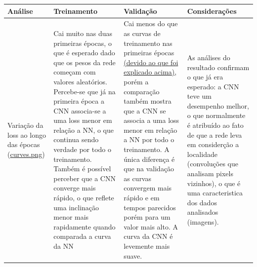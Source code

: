 \documentclass[11pt,a4paper]{article}
\begin{document}
\begin{table}[H]
\centering
\begin{tabular}{>{\raggedright\arraybackslash}p{} >{\raggedright\arraybackslash}p{} >{\raggedright\arraybackslash}p{} >{\raggedright\arraybackslash}p{}}
\toprule
\textbf{Análise} & \textbf{Treinamento} & \textbf{Validação} & \textbf{Considerações} \\
\midrule
Variação da loss ao longo das épocas (\href{https://github.com/deconr/MAC5921-DeepLearning/blob/main/ep1/results/curves.png}{curves.png}) & Cai muito nas duas primeiras épocas, o que é esperado dado que os pesos da rede começam com valores aleatórios. Percebe-se que já na primeira época a CNN associa-se a uma loss menor em relação a NN, o que continua sendo verdade por todo o treinamento. Também é possível perceber que a CNN converge mais rápido, o que reflete uma inclinação menor mais rapidamente quando comparada a curva da NN & Cai menos do que as curvas de treinamento nas primeiras épocas \hyperlink{explicacao-dinamica-loss}{(devido ao que foi explicado acima)}, porém a comparação também mostra que a CNN se associa a uma loss menor em relação a NN por todo o treinamento. A única diferença é que na validação as curvas convergem mais rápido e em tempos parecidos porém para um valor mais alto. A curva da CNN é levemente mais suave. & As análises do resultado confirmam o que já era esperado: a CNN teve um desempenho melhor, o que normalmente é atribuído ao fato de que a rede leva em considerção a localidade (convoluções que analisam pixels vizinhos), o que é uma caracteristica dos dados analisados (imagens). \\
\bottomrule
\end{tabular}
\end{table}
\end{document}
